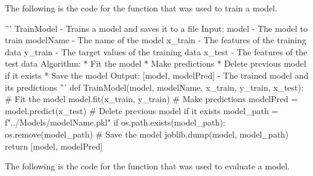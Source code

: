{\begin{highlight}[Assets]
        The following is the code for the function that was used to train a model.

    \begin{code}[Python]
    ''' TrainModel - Trains a model and saves it to a file
            Input:
                model - The model to train
                modelName - The name of the model
                x_train - The features of the training data
                y_train - The target values of the training data
                x_test - The features of the test data
            Algorithm:
                * Fit the model
                * Make predictions
                * Delete previous model if it exists
                * Save the model
            Output:
                [model, modelPred] - The trained model and its predictions
    '''
    def TrainModel(model, modelName, x_train, y_train, x_test):
        # Fit the model
        model.fit(x_train, y_train)
        # Make predictions
        modelPred = model.predict(x_test)
        # Delete previous model if it exists
        model_path = f"../Models/{modelName}.pkl"
        if os.path.exists(model_path):
            os.remove(model_path)
        # Save the model
        joblib.dump(model, model_path)
        return [model, modelPred]
    \end{code}

        The following is the code for the function that was used to evaluate a model.


\end{highlight}}
